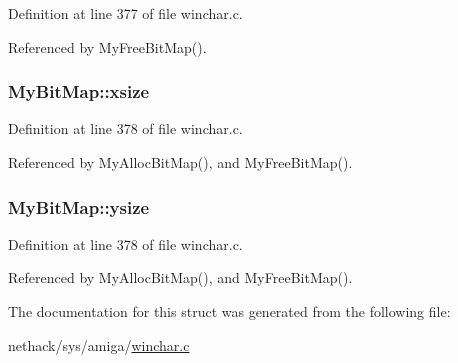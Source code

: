 Definition at line 377 of file winchar.\+c.



Referenced by My\+Free\+Bit\+Map().

\hypertarget{structMyBitMap_ae0804d602af334c249af60c59ba5422e}{
\subsubsection[{xsize}]{ My\+Bit\+Map\+::xsize}}\label{structMyBitMap_ae0804d602af334c249af60c59ba5422e}


Definition at line 378 of file winchar.\+c.



Referenced by My\+Alloc\+Bit\+Map(), and My\+Free\+Bit\+Map().

\hypertarget{structMyBitMap_aae7794695e54b85bbe7f276e290d5455}{
\subsubsection[{ysize}]{ My\+Bit\+Map\+::ysize}}\label{structMyBitMap_aae7794695e54b85bbe7f276e290d5455}


Definition at line 378 of file winchar.\+c.



Referenced by My\+Alloc\+Bit\+Map(), and My\+Free\+Bit\+Map().



The documentation for this struct was generated from the following file\+:\begin{DoxyCompactItemize}
\item 
nethack/sys/amiga/\hyperlink{winchar_8c}{winchar.\+c}\end{DoxyCompactItemize}
